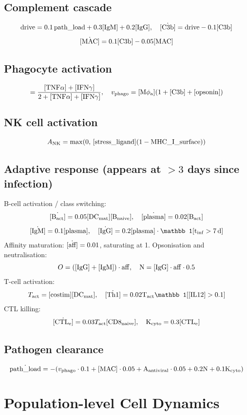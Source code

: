 \documentclass[11pt,a4paper]{article}
\newcommand{\eq}[1]{\begin{equation}#1\end{equation}}
\begin{document}
\subsection{Complement cascade}
\eq{ \mathrm{drive}=0.1\,\mathrm{path\_load}+0.3[\rm IgM]+0.2[\rm IgG],\quad \dot{[\rm C3b]}=\mathrm{drive}-0.1[\rm C3b] }
\eq{ \dot{[\rm MAC]}=0.1[\rm C3b]-0.05[\rm MAC] }

\subsection{Phagocyte activation}
\eq{ [\rm M\phi_a]=\frac{[\rm TNF\alpha]+[\rm IFN\gamma]}{2+[\rm TNF\alpha]+[\rm IFN\gamma]},\quad v_{\rm phago}=[\rm M\phi_a](1+[\rm C3b]+[\rm opsonin]) }

\subsection{NK cell activation}
\eq{ A_{\rm NK}=\max(0,\,[\rm stress\_ligand](1-\mathrm{MHC\_I\_surface})) }

\subsection{Adaptive response (appears at $>3$ days since infection)}
B-cell activation / class switching:
\eq{ \dot{[\rm B_{\rm act}]}=0.05[\rm DC_{\rm mat}][\rm B_{\rm naive}],\quad \dot{[\rm plasma]}=0.02[\rm B_{\rm act}] }
\eq{ \dot{[\rm IgM]}=0.1[\rm plasma],\quad \dot{[\rm IgG]}=0.2[\rm plasma]\cdot\mathbb 1[t_{\rm inf}>7\,\mathrm d] }
Affinity maturation: $\dot{[\rm aff]}=0.01$, saturating at 1.
Opsonisation and neutralisation:
\eq{ O=([\rm IgG]+[\rm IgM])\cdot\mathrm{aff},\quad N=[\rm IgG]\cdot\mathrm{aff}\cdot 0.5 }
T-cell activation:
\eq{ T_{\rm act}=[\rm costim][\rm DC_{\rm mat}],\quad \dot{[\rm Th1]}=0.02 T_{\rm act}\mathbb 1[[\rm IL12]>0.1] }
CTL killing:
\eq{ \dot{[\rm CTL_e]}=0.03 T_{\rm act}[\rm CD8_{\rm naive}],\quad K_{\rm cyto}=0.3[\rm CTL_e] }

\subsection{Pathogen clearance}
\eq{ \dot{\mathrm{path\_load}}= -(v_{\rm phago}\cdot 0.1 + [\rm MAC]\cdot 0.05 + A_{\rm antiviral}\cdot 0.05 + 0.2 N + 0.1 K_{\rm cyto}) }

\clearpage
\section{Population-level Cell Dynamics}
\label{sec:popn}
\end{document}
